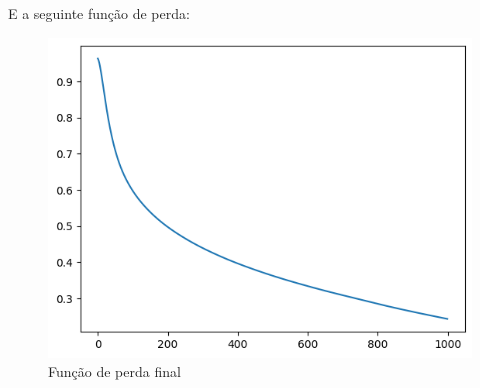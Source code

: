 \documentclass{article}
\begin{document}
E a seguinte função de perda:

\begin{figure}[ht!]
    \centering
    \includegraphics[width=0.5\linewidth]{final_loss.png}
    \caption{Função de perda final}
\end{figure}
\end{document}
